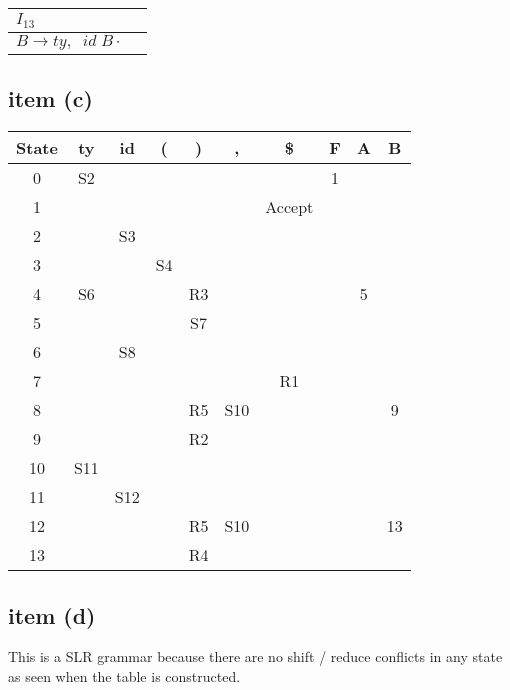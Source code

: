 \documentclass[11pt]{article}
\begin{document}
\begin{multicols}{2}
\begin{table}[H]
\centering
\begin{tabular}{l c}
$I_{13}$ & \\
\hline
$B \rightarrow ty , \; \; id \; B \cdot$ &    
\end{tabular}
\end{table}

\end{multicols}

\subsection*{item (c)}

\begin{table}[H]
\centering
\begin{tabular}{c | c c c c c c | c c c}
State & ty  & id  & (  & )  & ,   & \$     & F & A & B  \\
\hline
0     & S2  &     &    &    &     &        & 1 &   &    \\
1     &     &     &    &    &     & Accept &   &   &    \\
2     &     & S3  &    &    &     &        &   &   &    \\
3     &     &     & S4 &    &     &        &   &   &    \\
4     & S6  &     &    & R3 &     &        &   & 5 &    \\
5     &     &     &    & S7 &     &        &   &   &    \\
6     &     & S8  &    &    &     &        &   &   &    \\
7     &     &     &    &    &     & R1     &   &   &    \\
8     &     &     &    & R5 & S10 &        &   &   & 9  \\
9     &     &     &    & R2 &     &        &   &   &    \\
10    & S11 &     &    &    &     &        &   &   &    \\
11    &     & S12 &    &    &     &        &   &   &    \\
12    &     &     &    & R5 & S10 &        &   &   & 13 \\
13    &     &     &    & R4 &     &        &   &   &    \\   

\end{tabular}
\end{table}

\subsection*{item (d)}

This is a SLR grammar because there are no shift / reduce conflicts in any state as seen when the table is constructed.
\end{document}
